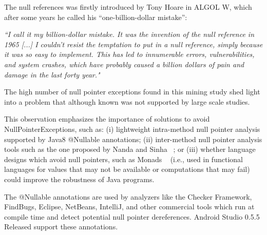 \documentclass[conference]{IEEEtran}
\begin{document}
The null references was firstly introduced by Tony Hoare in ALGOL W, which after some years he called his “one-billion-dollar mistake”:

\emph{``I call it my billion-dollar mistake. It was the invention of the null reference in 1965 [...] I couldn’t resist the temptation to put 
in a null reference, simply because it was so easy to implement. This has led to innumerable errors, vulnerabilities, and system 
crashes, which have probably caused a billion dollars of pain and damage in the last forty year."}

The high number of null pointer exceptions found in this mining study shed light into a problem
that although known was not supported by large scale studies. 

This observation emphasizes the importance of solutions to avoid NullPointerExceptions, such as:
(i) lightweight intra-method null pointer analysis supported by Java8 @Nullable annotations;
(ii) inter-method null pointer analysis tools such as the one proposed by Nanda and Sinha ~\cite{nanda2009accurate};
or (iii) whether language designs which avoid null pointers, such 
as Monads ~\cite{Walde95} (i.e., used in functional languages for values that may not be available 
or computations that may fail) could improve the robustness of Java programs. 

The @Nullable annotations are used by analyzers like the Checker Framework, FindBugs, Eclipse, 
NetBeans, IntelliJ, and other commercial tools which run at compile time and detect potential null 
pointer dereferences. Android Studio 0.5.5 Released support these annotations.



\end{document}
